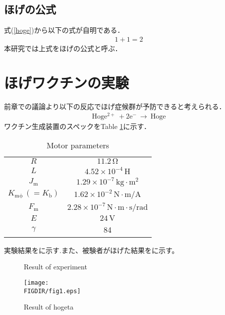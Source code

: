 \begin{small}
\subsection{ほげの公式}
式(\ref{hoge})から以下の式が自明である．
\begin{eqnarray}
1 + 1 = 2
\end{eqnarray}
本研究では上式をほげの公式と呼ぶ．
\section{ほげワクチンの実験}
前章での議論より以下の反応でほげ症候群が予防できると考えられる．
\begin{eqnarray}
\mathrm{Hoge^{2+} \ + 2e^{-} \ \rightarrow \ Hoge}
\end{eqnarray}
ワクチン生成装置のスペックをTable \ref{spec}に示す．
\begin{table}[b]
\caption{Motor parameters}
\label{spec}
\begin{center}
\begin{tabular}{c c}
\toprule
$R$ & $11.2\,\mathrm{\Omega}$ \\
$L$ & $4.52 \times 10^{-4}\,\mathrm{H}$ \\
$J_\mathrm{m}$ & $1.29 \times 10^{-7}\,\mathrm{kg \cdot m^2}$ \\
$K_\mathrm{m\phi}\,(=K_\mathrm{b})$ & $1.62 \times 10^{-2}\,\mathrm{N \cdot m / A}$ \\
$F_\mathrm{m}$ & $2.28 \times 10^{-7}\,\mathrm{N \cdot m \cdot s / rad}$ \\
$E$ & $24\,\mathrm{V}$ \\
$\gamma$ & 84 \\
\bottomrule
\end{tabular}
\end{center}
\end{table}
実験結果をに示す.また、被験者がほげた結果をに示す。
 
\begin{figure}[b]
\begin{center}
\caption{Result of experiment}
\end{center}
\end{figure}
 
\begin{figure}[b]
\begin{center}
\texttt{[image: \\FIGDIR/fig1.eps]}%
\caption{Result of hogeta}
\end{center}
\end{figure}

\end{small}
